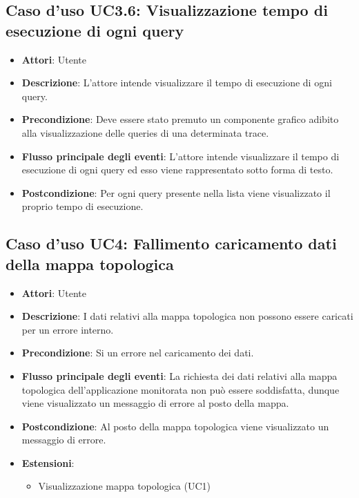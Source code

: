 \subsection{Caso d'uso UC3.6: Visualizzazione tempo di esecuzione di ogni query}
\begin{itemize}
\item \textbf{Attori}: Utente
\item \textbf{Descrizione}: L'attore intende visualizzare il tempo di esecuzione di ogni query.
\item \textbf{Precondizione}: Deve essere stato premuto un componente grafico adibito alla visualizzazione delle queries di una determinata trace.
\item \textbf{Flusso principale degli eventi}: L'attore intende visualizzare il tempo di esecuzione di ogni query ed esso viene rappresentato sotto forma di testo.
\item \textbf{Postcondizione}: Per ogni query presente nella lista viene visualizzato il proprio tempo di esecuzione.
\end{itemize}
\subsection{Caso d'uso UC4: Fallimento caricamento dati della mappa topologica}
\begin{itemize}
\item \textbf{Attori}: Utente
\item \textbf{Descrizione}: I dati relativi alla mappa topologica non possono essere caricati per un errore interno.
\item \textbf{Precondizione}: Si  un errore nel caricamento dei dati.
\item \textbf{Flusso principale degli eventi}: La richiesta dei dati relativi alla mappa topologica dell'applicazione monitorata non può essere soddisfatta, dunque viene visualizzato un messaggio di errore al posto della mappa.
\item \textbf{Postcondizione}: Al posto della mappa topologica viene visualizzato un messaggio di errore.
\item \textbf{Estensioni}:
\begin{itemize}
\item Visualizzazione mappa topologica (UC1)
\end{itemize}
\end{itemize}
